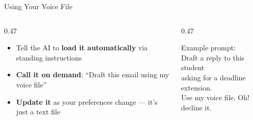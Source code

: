 \documentclass[aspectratio=169, 10pt]{beamer}
\begin{document}
\begin{frame}[fragile]{Using Your Voice File}
\begin{columns}[T]
\begin{column}{0.47\textwidth}
\begin{tcolorbox}[keybox, title={\faPen\quad Once the file exists}]
\small
\begin{itemize}\setlength{\itemsep}{2pt}
  \item Tell the AI to \textbf{load it automatically} via standing instructions
  \item \textbf{Call it on demand}: ``Draft this email using my voice file''
  \item \textbf{Update it} as your preferences change --- it's just a text file
\end{itemize}
\end{tcolorbox}
\end{column}
\begin{column}{0.47\textwidth}
\begin{tcolorbox}[colback=DarkSlate, colframe=DarkSlate, arc=3pt, left=6pt, right=6pt, top=4pt, bottom=4pt]
{\color{CoolGray}\ttfamily\tiny Example prompt:\\[2pt]
\color{white}\scriptsize
Draft a reply to this student\\
asking for a deadline extension.\\
Use my voice file. Oh! decline it.
}
\end{tcolorbox}
\end{column}
\end{columns}
\end{frame}

%
\end{document}
